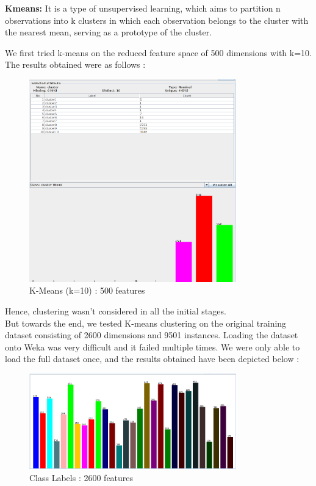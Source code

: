 \documentclass[12pt]{report}
\begin{document}
\textbf{Kmeans: }It is a type of unsupervised learning, which aims to partition n observations into k clusters in which each observation belongs to the cluster with the nearest mean, serving as a prototype of the cluster.

We first tried k-means on the reduced feature space of 500 dimensions with k=10. The results obtained were as follows :
\begin{figure}[H]
  \centering
  \includegraphics[width=0.8\textwidth]{Images/cluster_kmeans_10.png}
  \caption{K-Means (k=10) : 500 features}
\end{figure}

Hence, clustering wasn't considered in all the initial stages.\\

But towards the end, we tested K-means clustering on the original training dataset consisting of 2600 dimensions and 9501 instances. Loading the dataset onto Weka was very difficult and it failed multiple times. We were only able to load the full dataset once, and the results obtained have been depicted below :

\begin{figure}[H]
  \centering
  \includegraphics[width=0.8\textwidth]{Images/Labels_class_distribution.png}
  \caption{Class Labels : 2600 features}
\end{figure}
\end{document}
